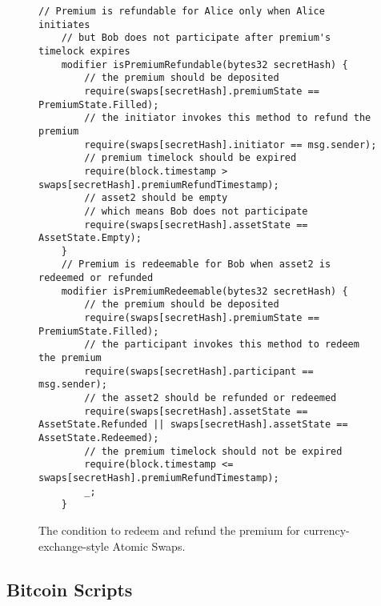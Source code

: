 \begin{figure}
    \begin{lstlisting}[language=Solidity, basicstyle=\tiny]
    // Premium is refundable for Alice only when Alice initiates
    // but Bob does not participate after premium's timelock expires
    modifier isPremiumRefundable(bytes32 secretHash) {
        // the premium should be deposited
        require(swaps[secretHash].premiumState == PremiumState.Filled);
        // the initiator invokes this method to refund the premium
        require(swaps[secretHash].initiator == msg.sender);
        // premium timelock should be expired
        require(block.timestamp > swaps[secretHash].premiumRefundTimestamp);
        // asset2 should be empty
        // which means Bob does not participate
        require(swaps[secretHash].assetState == AssetState.Empty);
    }
    // Premium is redeemable for Bob when asset2 is redeemed or refunded
    modifier isPremiumRedeemable(bytes32 secretHash) {
        // the premium should be deposited
        require(swaps[secretHash].premiumState == PremiumState.Filled);
        // the participant invokes this method to redeem the premium
        require(swaps[secretHash].participant == msg.sender);
        // the asset2 should be refunded or redeemed
        require(swaps[secretHash].assetState == AssetState.Refunded || swaps[secretHash].assetState == AssetState.Redeemed);
        // the premium timelock should not be expired
        require(block.timestamp <= swaps[secretHash].premiumRefundTimestamp);
        _;
    }
    \end{lstlisting}
    \label{code:premium_condition}
    \caption{The condition to redeem and refund the premium for currency-exchange-style Atomic Swaps.}
\end{figure}

\subsection{Bitcoin Scripts}

